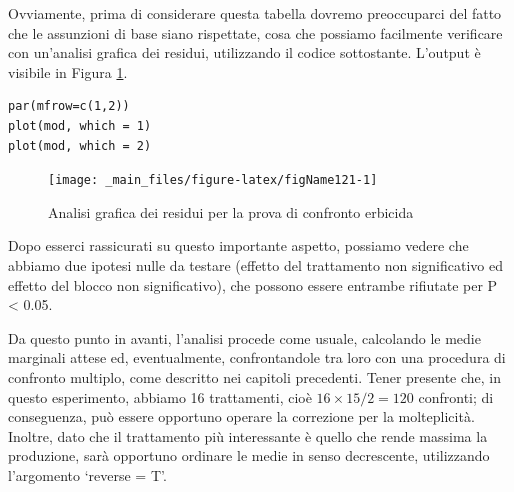 \documentclass[a4paper,12pt,oneside]{book}
\begin{document}
Ovviamente, prima di considerare questa tabella dovremo preoccuparci del fatto che le assunzioni di base siano rispettate, cosa che possiamo facilmente verificare con un'analisi grafica dei residui, utilizzando il codice sottostante. L'output è visibile in Figura \ref{fig:figName121}.

\begin{verbatim}
par(mfrow=c(1,2))
plot(mod, which = 1)
plot(mod, which = 2)
\end{verbatim}

\begin{figure}

{\centering \texttt{[image: \_main\_files/figure-latex/figName121-1]} 

}

\caption{Analisi grafica dei residui per la prova di confronto erbicida}\label{fig:figName121}
\end{figure}

Dopo esserci rassicurati su questo importante aspetto, possiamo vedere che abbiamo due ipotesi nulle da testare (effetto del trattamento non significativo ed effetto del blocco non significativo), che possono essere entrambe rifiutate per P \textless{} 0.05.

Da questo punto in avanti, l'analisi procede come usuale, calcolando le medie marginali attese ed, eventualmente, confrontandole tra loro con una procedura di confronto multiplo, come descritto nei capitoli precedenti. Tener presente che, in questo esperimento, abbiamo 16 trattamenti, cioè \(16 \times 15 / 2 = 120\) confronti; di conseguenza, può essere opportuno operare la correzione per la molteplicità. Inoltre, dato che il trattamento più interessante è quello che rende massima la produzione, sarà opportuno ordinare le medie in senso decrescente, utilizzando l'argomento `reverse = T'.

\scriptsize
\end{document}
